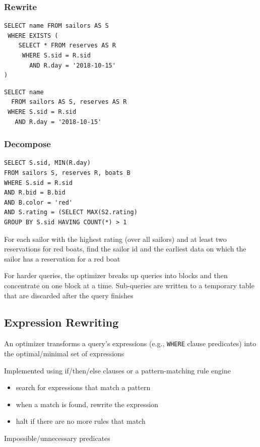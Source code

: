 \documentclass[11pt]{article}
\begin{document}
\subsubsection{Rewrite}
\label{sec:org3c2c0c0}
\begin{verbatim}
SELECT name FROM sailors AS S
 WHERE EXISTS (
    SELECT * FROM reserves AS R
     WHERE S.sid = R.sid
       AND R.day = '2018-10-15'
)
\end{verbatim}

\begin{verbatim}
SELECT name
  FROM sailors AS S, reserves AS R
 WHERE S.sid = R.sid
   AND R.day = '2018-10-15'
\end{verbatim}
\subsubsection{Decompose}
\label{sec:org08c674f}
\begin{verbatim}
SELECT S.sid, MIN(R.day)
FROM sailors S, reserves R, boats B
WHERE S.sid = R.sid
AND R.bid = B.bid
AND B.color = 'red'
AND S.rating = (SELECT MAX(S2.rating)
GROUP BY S.sid HAVING COUNT(*) > 1
\end{verbatim}
For each sailor with the highest rating (over all sailors) and at least two reservations for red
boats, find the sailor id and the earliest data on which the sailor has a reservation for a red
boat

For harder queries, the optimizer breaks up queries into blocks and then concentrate on one
block at a time. Sub-queries are written to a temporary table that are discarded after the query finishes
\subsection{Expression Rewriting}
\label{sec:orgaf9e07c}
An optimizer transforms a query's expressions (e.g., \texttt{WHERE} clause predicates) into the
optimal/minimal set of expressions

Implemented using if/then/else clauses or a pattern-matching rule engine
\begin{itemize}
\item search for expressions that match a pattern
\item when a match is found, rewrite the expression
\item halt if there are no more rules that match
\end{itemize}

Impossible/unnecessary predicates
\end{document}
